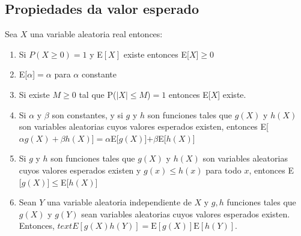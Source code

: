 \subsection{Propiedades da valor esperado}
\begin{Teo}
    Sea $X$ una variable aleatoria real entonces:
    \begin{enumerate}
        \item Si $P(X \geq 0) = 1$ y E$[X]$ existe entonces E[$X$]$\geq 0$
        \item E[$\alpha$]$= \alpha$ para $\alpha$ constante
        \item Si existe $M \geq 0$ tal que P($|X| \leq M$)$=1$ entonces E[$X$] existe. 
        \item Si $\alpha$ y $\beta$ son constantes, y si $g$ y $h$ son funciones tales que 
              $g(X)$ y $h(X)$ son variables aleatorias cuyos valores esperados existen, 
              entonces E[$\alpha g(X) + \beta h(X)$]$= \alpha$E[$g(X)$]$+ \beta$E[$h(X)$]
        \item Si $g$ y $h$ son funciones tales que $g(X)$ y $h(X)$ son variables aleatorias
              cuyos valores esperados existen y $g(x)\leq h(x)$ para todo $x$, entonces 
              E$[g(X)$]$\leq$E[$h(X)$]
        \item Sean $Y$ una variable aleatoria independiente de $X$ y $g,h$ funciones
        tales que $g(X)$ y $g(Y)$ sean variables aleatorias cuyos valores esperados
        existen. Entonces, $text{E}[g(X)h(Y)]=\text{E}[g(X)]\text{E}[h(Y)]$.
    \end{enumerate}
\end{Teo}
